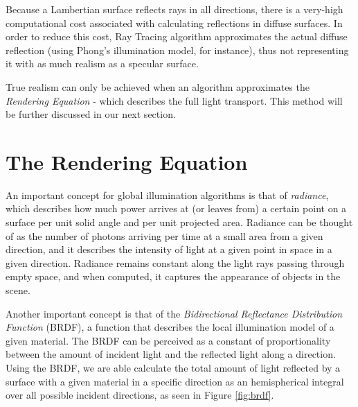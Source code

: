 
Because a Lambertian surface reflects rays in all directions, there is a very-high computational cost associated with calculating reflections in diffuse surfaces. In order to reduce this cost, Ray Tracing algorithm approximates the actual diffuse reflection (using Phong's illumination model, for instance), thus not representing it with as much realism as a specular surface.

True realism can only be achieved when an algorithm approximates the \textit{Rendering Equation} \cite{Kajiya:1986} - which describes the full light transport.
This method will be further discussed in our next section. 

\section{The Rendering Equation}

An important concept for global illumination algorithms is that of \textit{radiance}, which describes how much power arrives at (or leaves from) a certain point on a surface per unit solid angle and per unit projected area. Radiance can be thought of as the number of photons arriving per time at a small area from a given direction, and it describes the intensity of light at a given point in space in a given direction. Radiance remains constant along the light rays passing through empty space, and when computed, it captures the appearance of objects in the scene.

Another important concept is that of the \textit{Bidirectional Reflectance Distribution Function} (BRDF), a function that describes the local illumination model of a given material. The BRDF can be perceived as a constant of proportionality between the amount of incident light and the reflected light along a direction. Using the BRDF, we are able calculate the total amount of light reflected by a surface with a given material in a specific direction as an hemispherical integral over all possible incident directions, as seen in Figure \ref{fig:brdf}.

